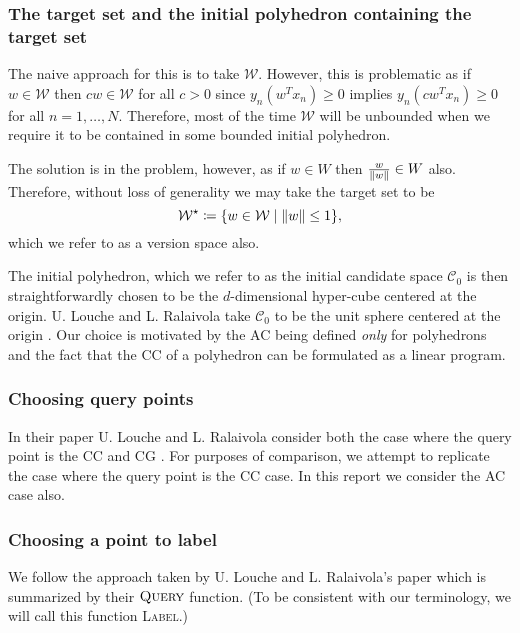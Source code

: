 \documentclass[11pt]{amsart}
\theoremstyle{definition}
\theoremstyle{remark}
\newcommand{\transpose}{T}
\begin{document}
            \subsubsection*{The target set and the initial polyhedron containing the target set} The naive approach for this is to take $\mathcal{W}$. However, this is problematic as if $w \in \mathcal{W}$ then $cw \in \mathcal{W}$ for all $c>0$ since $y_n (w^\transpose x_n) \geq 0$ implies $y_n (cw^\transpose x_n) \geq 0$ for all $n = 1, \dots, N$. Therefore, most of the time $\mathcal{W}$ will be unbounded when we require it to be contained in some bounded initial polyhedron. 

            The solution is in the problem, however, as if $w \in W$ then $\frac{w}{\norm{w}} \in W$ also. Therefore, without loss of generality we may take the target set to be
            \begin{equation*}
                \mathcal{W}^\star \coloneqq \{w \in \mathcal{W} \;|\; \norm{w} \leq 1\},
            \end{equation*}
            which we refer to as a version space also.

            The initial polyhedron, which we refer to as the initial candidate space $\mathcal{C}_0$ is then straightforwardly chosen to be the $d$-dimensional hyper-cube centered at the origin. U. Louche and L. Ralaivola take $\mathcal{C}_0$ to be the unit sphere centered at the origin \cite[Section II.B]{LR15}. Our choice is motivated by the AC being defined \emph{only} for polyhedrons and the fact that the CC of a polyhedron can be formulated as a linear program.

            \subsubsection*{Choosing query points} In their paper U. Louche and L. Ralaivola consider both the case where the query point is the CC and  CG \cite[Section III.D]{LR15}. For purposes of comparison, we attempt to replicate the case where the query point is the CC case. In this report we consider the AC case also.

            \subsubsection*{Choosing a point to label }We follow the approach taken by U. Louche and L. Ralaivola's paper \cite[Section III.D]{LR15} which is summarized by their $\textsc{Query}$ function. (To be consistent with our terminology, we will call this function \textsc{Label}.)
\end{document}
